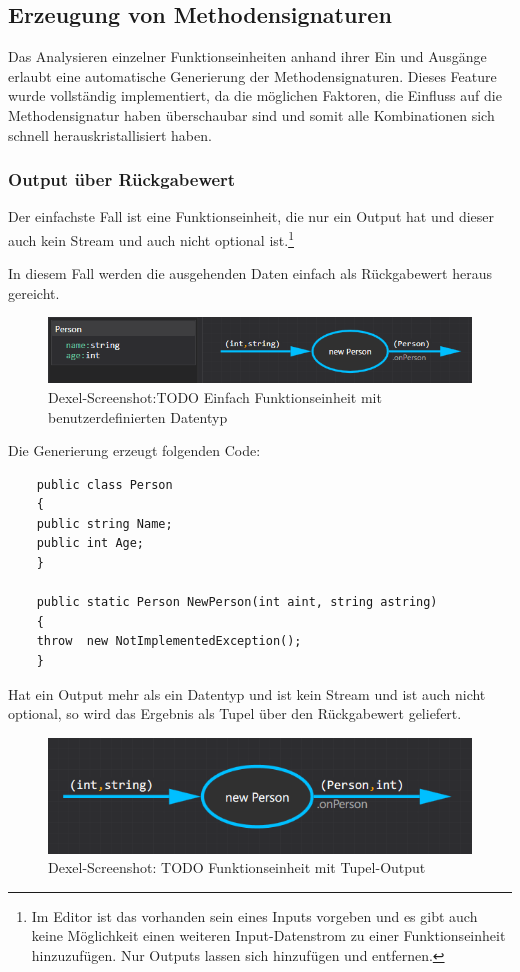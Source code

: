 \subsection{Erzeugung von Methodensignaturen}

Das Analysieren einzelner Funktionseinheiten anhand ihrer Ein und Ausgänge erlaubt eine automatische Generierung der Methodensignaturen.
Dieses Feature wurde vollständig implementiert, da die möglichen Faktoren, die Einfluss auf die Methodensignatur haben überschaubar sind und somit alle Kombinationen sich schnell herauskristallisiert haben.

\subsubsection{Output über Rückgabewert}

	Der einfachste Fall ist eine Funktionseinheit, die nur ein Output hat und
	dieser auch kein Stream und auch nicht optional ist.\footnote{Im Editor ist das vorhanden sein eines Inputs vorgeben und es gibt auch keine Möglichkeit einen weiteren Input-Datenstrom zu einer Funktionseinheit hinzuzufügen. Nur Outputs lassen sich hinzufügen und entfernen.}
	
	In diesem Fall werden die ausgehenden Daten einfach als Rückgabewert heraus gereicht.
	
	
	\begin{figure}[!htbp]
		\centering
			\includegraphics[width=\linewidth]{./img/roslyn_simpleOutput.png} 
		\caption{Dexel-Screenshot:TODO Einfach Funktionseinheit mit benutzerdefinierten Datentyp}
	\end{figure}

	
	Die Generierung erzeugt folgenden Code:
	\begin{verbatim}
	public class Person
	{
	public string Name;
	public int Age;
	}
	
	public static Person NewPerson(int aint, string astring)
	{
	throw  new NotImplementedException();
	}
	\end{verbatim}
	
	Hat ein Output mehr als ein Datentyp und ist kein Stream und ist auch nicht optional, so
	wird das Ergebnis als Tupel über den Rückgabewert geliefert.
	
		\begin{figure}[!htbp]
			\centering
			\includegraphics[width=.8\linewidth]{./img/roslyn_twoDatatypesOneOutput.png} 
			\caption{Dexel-Screenshot:  TODO Funktionseinheit mit Tupel-Output}
		\end{figure}

